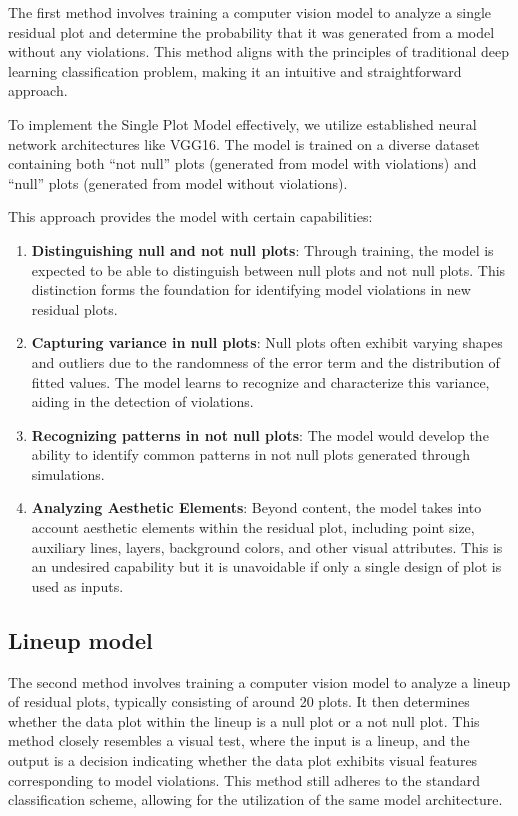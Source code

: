 \documentclass[]{interact}
\theoremstyle{plain}%
\theoremstyle{definition}
\theoremstyle{remark}
\begin{document}
The first method involves training a computer vision model to analyze a
single residual plot and determine the probability that it was generated
from a model without any violations. This method aligns with the
principles of traditional deep learning classification problem, making
it an intuitive and straightforward approach.

To implement the Single Plot Model effectively, we utilize established
neural network architectures like VGG16. The model is trained on a
diverse dataset containing both ``not null'' plots (generated from model
with violations) and ``null'' plots (generated from model without
violations).

This approach provides the model with certain capabilities:

\begin{enumerate}
\def\labelenumi{\arabic{enumi}.}
\item
  \textbf{Distinguishing null and not null plots}: Through training, the
  model is expected to be able to distinguish between null plots and not
  null plots. This distinction forms the foundation for identifying
  model violations in new residual plots.
\item
  \textbf{Capturing variance in null plots}: Null plots often exhibit
  varying shapes and outliers due to the randomness of the error term
  and the distribution of fitted values. The model learns to recognize
  and characterize this variance, aiding in the detection of violations.
\item
  \textbf{Recognizing patterns in not null plots}: The model would
  develop the ability to identify common patterns in not null plots
  generated through simulations.
\item
  \textbf{Analyzing Aesthetic Elements}: Beyond content, the model takes
  into account aesthetic elements within the residual plot, including
  point size, auxiliary lines, layers, background colors, and other
  visual attributes. This is an undesired capability but it is
  unavoidable if only a single design of plot is used as inputs.
\end{enumerate}

\hypertarget{lineup-model}{%
\subsection{Lineup model}\label{lineup-model}}

The second method involves training a computer vision model to analyze a
lineup of residual plots, typically consisting of around 20 plots. It
then determines whether the data plot within the lineup is a null plot
or a not null plot. This method closely resembles a visual test, where
the input is a lineup, and the output is a decision indicating whether
the data plot exhibits visual features corresponding to model
violations. This method still adheres to the standard classification
scheme, allowing for the utilization of the same model architecture.
\end{document}
